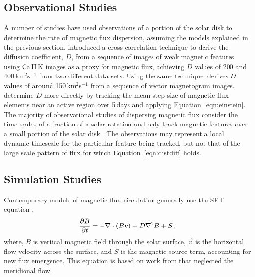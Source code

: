 \subsection{Observational Studies}\label{sect:obsstud}

A number of studies have used observations of a portion of the solar disk to determine the rate of magnetic flux dispersion, assuming the models explained in the previous section.
\cite{Mosher:1977} introduced a cross correlation technique to derive the diffusion coefficient, $D$, from a sequence of images of weak magnetic features using Ca\,II\,K images as a proxy for magnetic flux, achieving $D$ values of 200 and 400\,km$^2$s$^{-1}$ from two different data sets. Using the same technique, \cite{Wang:1988} derives $D$ values of around 150\,km$^2$s$^{-1}$ from a sequence of vector magnetogram images.
\cite{Lawrence:1993} determine $D$ more directly by tracking the mean step size of magnetic flux elements near an active region over 5\,days and applying Equation~\ref{eqn:einstein}.
The majority of observational studies of dispersing magnetic flux consider the time scales of a fraction of a solar rotation %
and only track magnetic features over a small portion of the solar disk \citep{Hagenaar:1997,Hagenaar:1999,Berger:1998}. %
The observations may represent a local dynamic timescale for the particular feature being tracked, but not that of the large scale pattern of flux for which Equation~\ref{eqn:distdiff} holds.

\subsection{Simulation Studies}

Contemporary models of magnetic flux circulation generally use the \gls{SFT} equation \citep{Devore:1984,Sheeley:1985},
\begin{equation}\label{eqn:sft}
\frac{\partial B}{\partial t}=-\nabla \cdot (B \vec{v}) + D \nabla^2 B + S \mbox{\,,}
\end{equation}
where, $B$ is vertical magnetic field through the solar surface, $\vec{v}$ is the horizontal flow velocity across the surface, and $S$ is the magnetic source term, accounting for new flux emergence. This equation is based on work from \cite{Leighton:1964} that neglected the meridional flow. %

